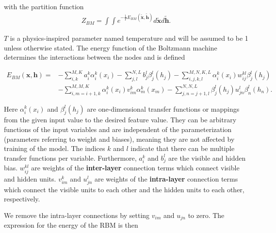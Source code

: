 \documentclass[%
oneside,                 %
final,                   %
10pt]{article}
\begin{document}
with the partition function 
\begin{align}
	Z_{BM} = \int \int e^{-\frac{1}{T} E_{BM}(\tilde{\bm{x}}, \tilde{\bm{h}})} d\tilde{\bm{x}} d\tilde{\bm{h}} .
\end{align}

$T$ is a physics-inspired parameter named temperature and will be assumed to be 1 unless otherwise stated. The energy function of the Boltzmann machine determines the interactions between the nodes and is defined  

\begin{align}
	E_{BM}(\bm{x}, \bm{h}) =& - \sum_{i, k}^{M, K} a_i^k \alpha_i^k (x_i)
	- \sum_{j, l}^{N, L} b_j^l \beta_j^l (h_j) 
	- \sum_{i,j,k,l}^{M,N,K,L} \alpha_i^k (x_i) w_{ij}^{kl} \beta_j^l (h_j) \nonumber \\
	&- \sum_{i, m=i+1, k}^{M, M, K} \alpha_i^k (x_i) v_{im}^k \alpha_m^k (x_m)
	- \sum_{j,n=j+1,l}^{N,N,L} \beta_j^l (h_j) u_{jn}^l \beta_n^l (h_n).
\end{align}

Here $\alpha_i^k (x_i)$ and $\beta_j^l (h_j)$ are one-dimensional
transfer functions or mappings from the given input value to the
desired feature value. They can be arbitrary functions of the input
variables and are independent of the parameterization (parameters
referring to weight and biases), meaning they are not affected by
training of the model. The indices $k$ and $l$ indicate that there can
be multiple transfer functions per variable.  Furthermore, $a_i^k$ and
$b_j^l$ are the visible and hidden bias. $w_{ij}^{kl}$ are weights of
the \textbf{inter-layer} connection terms which connect visible and
hidden units. $ v_{im}^k$ and $u_{jn}^l$ are weights of the
\textbf{intra-layer} connection terms which connect the visible units
to each other and the hidden units to each other, respectively.

We remove the intra-layer connections by setting $v_{im}$ and $u_{jn}$
to zero. The expression for the energy of the RBM is then
\end{document}
